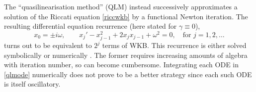 \documentclass[10pt]{article}
\newcommand{\be}{\begin{equation}}
\newcommand{\ee}{\end{equation}}
\newcommand{\om}{\omega}
\begin{document}
The ``quasilinearisation method''
(QLM) \cite{bellman1970} instead successively approximates
a solution of the Riccati equation \cref{riccwkb}
by a functional Newton iteration.
The resulting differential equation recurrence (here stated for $\gamma\equiv 0$),
\be
x_0 = \pm i\om,
\qquad
x_j' - x_{j-1}^2 + 2x_j x_{j-1} + \om^2 = 0, \quad \text{for } j = 1, 2, \ldots
\label{qlmode}
\ee
turns out to be equivalent to $2^j$ terms of WKB.
This recurrence is either solved symbolically \cite{mandelzweig2004,krivec2006}
or numerically \cite{krivec2008,krivec2014}. The former
requires increasing amounts of algebra with iteration number, so can
become cumbersome. Integrating each ODE in \cref{qlmode} numerically does not prove to be a better strategy since each such ODE is itself oscillatory.
\end{document}

